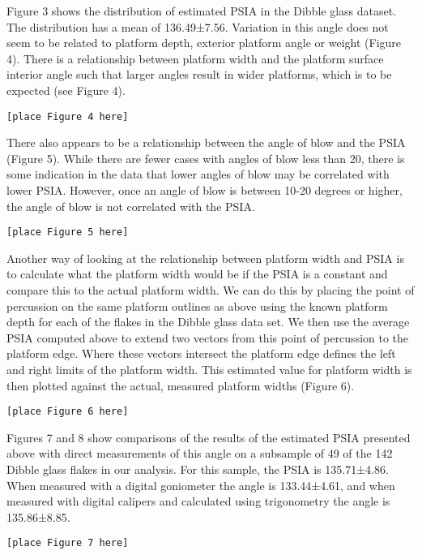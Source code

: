 \documentclass[10pt,letterpaper]{article}
\begin{document}
Figure 3 shows the distribution of estimated PSIA in the Dibble glass
dataset. The distribution has a mean of 136.49±7.56. Variation in this
angle does not seem to be related to platform depth, exterior platform
angle or weight (Figure 4). There is a relationship between platform
width and the platform surface interior angle such that larger angles
result in wider platforms, which is to be expected (see Figure 4).

\begin{verbatim}
[place Figure 4 here]
\end{verbatim}

There also appears to be a relationship between the angle of blow and
the PSIA (Figure 5). While there are fewer cases with angles of blow
less than 20, there is some indication in the data that lower angles of
blow may be correlated with lower PSIA. However, once an angle of blow
is between 10-20 degrees or higher, the angle of blow is not correlated
with the PSIA.

\begin{verbatim}
[place Figure 5 here]
\end{verbatim}

Another way of looking at the relationship between platform width and
PSIA is to calculate what the platform width would be if the PSIA is a
constant and compare this to the actual platform width. We can do this
by placing the point of percussion on the same platform outlines as
above using the known platform depth for each of the flakes in the
Dibble glass data set. We then use the average PSIA computed above to
extend two vectors from this point of percussion to the platform edge.
Where these vectors intersect the platform edge defines the left and
right limits of the platform width. This estimated value for platform
width is then plotted against the actual, measured platform widths
(Figure 6).

\begin{verbatim}
[place Figure 6 here]
\end{verbatim}

Figures 7 and 8 show comparisons of the results of the estimated PSIA
presented above with direct measurements of this angle on a subsample of
49 of the 142 Dibble glass flakes in our analysis. For this sample, the
PSIA is 135.71±4.86. When measured with a digital goniometer the angle
is 133.44±4.61, and when measured with digital calipers and calculated
using trigonometry the angle is 135.86±8.85.

\begin{verbatim}
[place Figure 7 here]
\end{verbatim}
\end{document}
